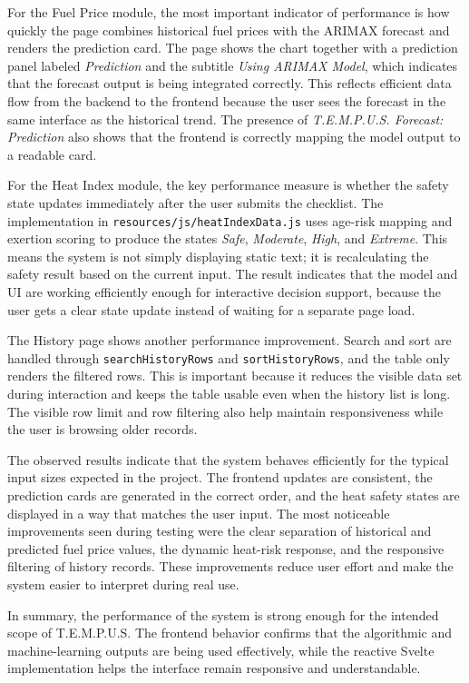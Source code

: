 \documentclass[12pt]{article}
\begin{document}
For the Fuel Price module, the most important indicator of performance is how quickly the page combines historical fuel prices with the ARIMAX forecast and renders the prediction card. The page shows the chart together with a prediction panel labeled \textit{Prediction} and the subtitle \textit{Using ARIMAX Model}, which indicates that the forecast output is being integrated correctly. This reflects efficient data flow from the backend to the frontend because the user sees the forecast in the same interface as the historical trend. The presence of \textit{T.E.M.P.U.S. Forecast: Prediction} also shows that the frontend is correctly mapping the model output to a readable card.

For the Heat Index module, the key performance measure is whether the safety state updates immediately after the user submits the checklist. The implementation in \texttt{resources/js/heatIndexData.js} uses age-risk mapping and exertion scoring to produce the states \textit{Safe}, \textit{Moderate}, \textit{High}, and \textit{Extreme}. This means the system is not simply displaying static text; it is recalculating the safety result based on the current input. The result indicates that the model and UI are working efficiently enough for interactive decision support, because the user gets a clear state update instead of waiting for a separate page load.

The History page shows another performance improvement. Search and sort are handled through \texttt{searchHistoryRows} and \texttt{sortHistoryRows}, and the table only renders the filtered rows. This is important because it reduces the visible data set during interaction and keeps the table usable even when the history list is long. The visible row limit and row filtering also help maintain responsiveness while the user is browsing older records.

The observed results indicate that the system behaves efficiently for the typical input sizes expected in the project. The frontend updates are consistent, the prediction cards are generated in the correct order, and the heat safety states are displayed in a way that matches the user input. The most noticeable improvements seen during testing were the clear separation of historical and predicted fuel price values, the dynamic heat-risk response, and the responsive filtering of history records. These improvements reduce user effort and make the system easier to interpret during real use.

In summary, the performance of the system is strong enough for the intended scope of T.E.M.P.U.S. The frontend behavior confirms that the algorithmic and machine-learning outputs are being used effectively, while the reactive Svelte implementation helps the interface remain responsive and understandable.
\end{document}
